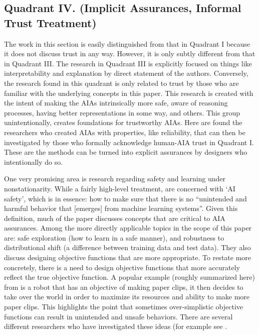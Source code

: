 \subsection{Quadrant IV. (Implicit Assurances, Informal Trust Treatment)}\label{sec:q4}
    The work in this section is easily distinguished from that in Quadrant I because it does not discuss trust in any way. However, it is only subtly different from that in Quadrant III. The research in Quadrant III is explicitly focused on things like interpretability and explanation by direct statement of the authors. Conversely, the research found in this quadrant is only related to trust by those who are familiar with the underlying concepts in this paper. This research is created with the intent of making the AIAs intrinsically more safe, aware of reasoning processes, having better representations in some way, and others. This group unintentionally, creates foundations for trustworthy AIAs. Here are found the researchers who created AIAs with properties, like reliability, that can then be investigated by those who formally acknowledge human-AIA trust in Quadrant I. These are the methods can be turned into explicit assurances by designers who intentionally do so. 

    One very promising area is research regarding safety and learning under nonstationarity. While a fairly high-level treatment, \citet{Amodei2016-xi} are concerned with `AI safety', which is in essence: how to make sure that there is no ``unintended and harmful behavior that [emerges] from machine learning systems''. Given this definition, much of the paper discusses concepts that are critical to AIA assurances. Among the more directly applicable topics in the scope of this paper are: safe exploration (how to learn in a safe manner), and robustness to distributional shift (a difference between training data and test data). They also discuss designing objective functions that are more appropriate. To restate more concretely, there is a need to design objective functions that more accurately reflect the true objective function. A popular example (roughly summarized here) from \citet{Bostrom2014-fz} is a robot that has an objective of making paper clips, it then decides to take over the world in order to maximize its resources and ability to make more paper clips. This highlights the point that sometimes over-simplistic objective functions can result in unintended and unsafe behaviors. There are several different researchers who have investigated these ideas (for example see \cite{Sugiyama2013-ci,Quinonero-Candela2009-fj,Hadfield-Menell2016-ws,Da_Veiga2012-gh,Garcia2015-rs}.

